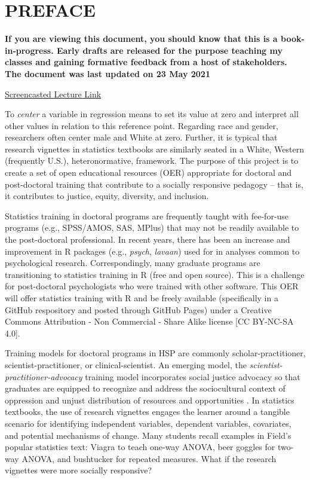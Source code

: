 \documentclass[
  english,
]{book}
\begin{document}
\hypertarget{preface}{%
\chapter*{PREFACE}\label{preface}}

\textbf{If you are viewing this document, you should know that this is a book-in-progress. Early drafts are released for the purpose teaching my classes and gaining formative feedback from a host of stakeholders. The document was last updated on 23 May 2021}

\href{https://spu.hosted.panopto.com/Panopto/Pages/Viewer.aspx?id=c932455e-ef06-444a-bdca-acf7012d759a}{Screencasted Lecture Link}

To \emph{center} a variable in regression means to set its value at zero and interpret all other values in relation to this reference point. Regarding race and gender, researchers often center male and White at zero. Further, it is typical that research vignettes in statistics textbooks are similarly seated in a White, Western (frequently U.S.), heteronormative, framework. The purpose of this project is to create a set of open educational resources (OER) appropriate for doctoral and post-doctoral training that contribute to a socially responsive pedagogy -- that is, it contributes to justice, equity, diversity, and inclusion.

Statistics training in doctoral programs are frequently taught with fee-for-use programs (e.g., SPSS/AMOS, SAS, MPlus) that may not be readily available to the post-doctoral professional. In recent years, there has been an increase and improvement in R packages (e.g., \emph{psych}, \emph{lavaan}) used for in analyses common to psychological research. Correspondingly, many graduate programs are transitioning to statistics training in R (free and open source). This is a challenge for post-doctoral psychologists who were trained with other software. This OER will offer statistics training with R and be freely available (specifically in a GitHub respository and posted through GitHub Pages) under a Creative Commons Attribution - Non Commercial - Share Alike license {[}CC BY-NC-SA 4.0{]}.

Training models for doctoral programs in HSP are commonly scholar-practitioner, scientist-practitioner, or clinical-scientist. An emerging model, the \emph{scientist-practitioner-advocacy} training model incorporates social justice advocacy so that graduates are equipped to recognize and address the sociocultural context of oppression and unjust distribution of resources and opportunities \citep{mallinckrodt_scientist-practitioner-advocate_2014}. In statistics textbooks, the use of research vignettes engages the learner around a tangible scenario for identifying independent variables, dependent variables, covariates, and potential mechanisms of change. Many students recall examples in Field's \citeyearpar{field_discovering_2012} popular statistics text: Viagra to teach one-way ANOVA, beer goggles for two-way ANOVA, and bushtucker for repeated measures. What if the research vignettes were more socially responsive?
\end{document}
